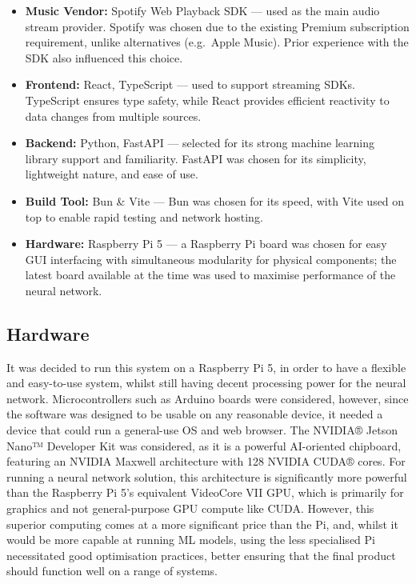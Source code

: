                 \begin{itemize}
                    \item \textbf{Music Vendor:} Spotify Web Playback SDK --- used as the main audio stream provider. Spotify was chosen due to the existing Premium subscription requirement, unlike alternatives (e.g.\ Apple Music). Prior experience with the SDK also influenced this choice.
    
                    \item \textbf{Frontend:} React, TypeScript --- used to support streaming SDKs. TypeScript ensures type safety, while React provides efficient reactivity to data changes from multiple sources.
                    
                    \item \textbf{Backend:} Python, FastAPI --- selected for its strong machine learning library support and familiarity. FastAPI was chosen for its simplicity, lightweight nature, and ease of use.
                    
                    \item \textbf{Build Tool:} Bun \& Vite --- Bun was chosen for its speed, with Vite used on top to enable rapid testing and network hosting.
    
                    \item \textbf{Hardware:} Raspberry Pi 5 --- a Raspberry Pi board was chosen for easy GUI interfacing with simultaneous modularity for physical components; the latest board available at the time was used to maximise performance of the neural network.
                \end{itemize}
    
        \subsection{Hardware}
    
            It was decided to run this system on a Raspberry Pi 5, in order to have a flexible and easy-to-use system, whilst still having decent processing power for the neural network. Microcontrollers such as Arduino boards were considered, however, since the software was designed to be usable on any reasonable device, it needed a device that could run a general-use OS and web browser. The NVIDIA® Jetson Nano™ Developer Kit was considered, as it is a powerful AI-oriented chipboard, featuring an NVIDIA Maxwell architecture with 128 NVIDIA CUDA® cores. For running a neural network solution, this architecture is significantly more powerful than the Raspberry Pi 5's equivalent VideoCore VII GPU, which is primarily for graphics and not general-purpose GPU compute like CUDA. However, this superior computing comes at a more significant price than the Pi, and, whilst it would be more capable at running ML models, using the less specialised Pi necessitated good optimisation practices, better ensuring that the final product should function well on a range of systems.
            
